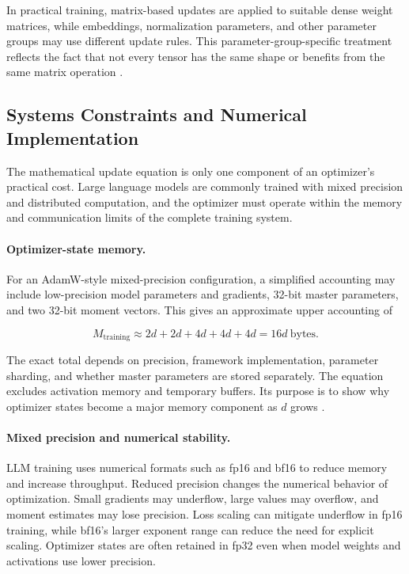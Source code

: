 In practical training, matrix-based updates are applied to suitable
dense weight matrices, while embeddings, normalization parameters,
and other parameter groups may use different update rules. This
parameter-group-specific treatment reflects the fact that not every
tensor has the same shape or benefits from the same matrix operation
\parencite{Ranganath2026Navigating}.

\subsection{Systems Constraints and Numerical Implementation}
\label{subsec:optimization-systems-constraints}

The mathematical update equation is only one component of an optimizer's
practical cost. Large language models are commonly trained with mixed
precision and distributed computation, and the optimizer must operate
within the memory and communication limits of the complete training
system.

\paragraph{Optimizer-state memory.}
For an AdamW-style mixed-precision configuration, a simplified
accounting may include low-precision model parameters and gradients,
32-bit master parameters, and two 32-bit moment vectors. This gives
an approximate upper accounting of

\begin{equation}
    M_{\mathrm{training}}
    \approx
    2d+2d+4d+4d+4d
    =
    16d\ \text{bytes}.
    \label{eq:opt-mixed-precision-memory}
\end{equation}

The exact total depends on precision, framework implementation,
parameter sharding, and whether master parameters are stored
separately. The equation excludes activation memory and temporary
buffers. Its purpose is to show why optimizer states become a major
memory component as $d$ grows
\parencite{Ranganath2026Navigating}.

\paragraph{Mixed precision and numerical stability.}
LLM training uses numerical formats such as fp16 and bf16 to reduce
memory and increase throughput. Reduced precision changes the
numerical behavior of optimization. Small gradients may underflow,
large values may overflow, and moment estimates may lose precision.
Loss scaling can mitigate underflow in fp16 training, while bf16's
larger exponent range can reduce the need for explicit scaling.
Optimizer states are often retained in fp32 even when model weights
and activations use lower precision.

